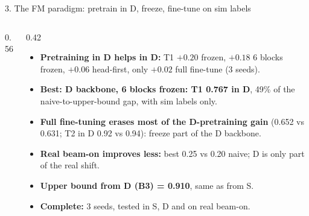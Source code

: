 \documentclass[aspectratio=169,10pt]{beamer}
\begin{document}
\begin{frame}{3. The FM paradigm: pretrain in D, freeze, fine-tune on sim labels}
\begin{columns}[T]
\begin{column}{0.56\textwidth}
    \end{column}
    \begin{column}{0.42\textwidth}
      \begin{itemize}\setlength{\itemsep}{3pt}
        \item \textbf{Pretraining in D helps in D:} T1 $+0.20$ frozen, $+0.18$ 6 blocks frozen, $+0.06$ head-first, only $+0.02$ full fine-tune (3 seeds).
        \item \textbf{Best: D backbone, 6 blocks frozen: T1 0.767 in D}, 49\% of the naive-to-upper-bound gap, with sim labels only.
        \item \textbf{Full fine-tuning erases most of the D-pretraining gain} (0.652 vs 0.631; T2 in D 0.92 vs 0.94): freeze part of the D backbone.
        \item \textbf{Real beam-on improves less:} best 0.25 vs 0.20 naive; D is only part of the real shift.
        \item \textbf{Upper bound from D (B3) = 0.910}, same as from S.
        \item \textbf{Complete:} 3 seeds, tested in S, D and on real beam-on.
      \end{itemize}
    \end{column}
  \end{columns}
\end{frame}
\end{document}
